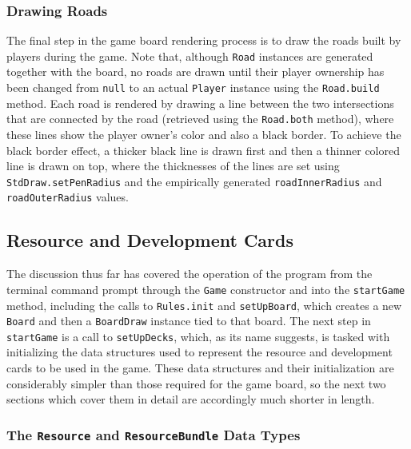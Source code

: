 \documentclass[pageno]{jpaper}
\begin{document}
\begin{doublespacing}
\hypertarget{sec:drawing_roads}{}
\subsubsection{Drawing Roads}

The final step in the game board rendering process is to draw the roads built by players during the game. Note that, although \lstinline$Road$ instances are generated together with the board, no roads are drawn until their player ownership has been changed from \lstinline$null$ to an actual \lstinline$Player$ instance using the \lstinline$Road.build$ method. Each road is rendered by drawing a line between the two intersections that are connected by the road (retrieved using the \lstinline$Road.both$ method), where these lines show the player owner's color and also a black border. To achieve the black border effect, a thicker black line is drawn first and then a thinner colored line is drawn on top, where the thicknesses of the lines are set using \lstinline$StdDraw.setPenRadius$ and the empirically generated \lstinline$roadInnerRadius$ and \lstinline$roadOuterRadius$ values. 

\hypertarget{sec:resource_and_development_cards}{}
\subsection{Resource and Development Cards}

The discussion thus far has covered the operation of the program from the terminal command prompt through the \lstinline$Game$ constructor and into the \lstinline$startGame$ method, including the calls to \lstinline$Rules.init$ and \lstinline$setUpBoard$, which creates a new \lstinline$Board$ and then a \lstinline$BoardDraw$ instance tied to that board. The next step in \lstinline$startGame$ is a call to \lstinline$setUpDecks$, which, as its name suggests, is tasked with initializing the data structures used to represent the resource and development cards to be used in the game. These data structures and their initialization are considerably simpler than those required for the game board, so the next two sections which cover them in detail are accordingly much shorter in length.

\hypertarget{sec:the_resource_and_resourcebundle_data_types}{}
\subsubsection{The \lstinline$Resource$ and \lstinline$ResourceBundle$ Data Types}


\end{doublespacing}
\end{document}
